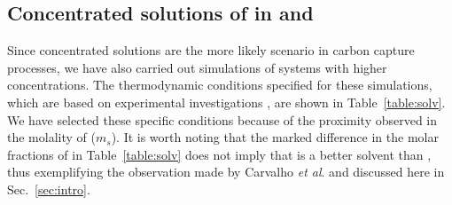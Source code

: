 \documentclass[3p,twocolumn]{elsarticle}
\begin{document}
\subsection{Concentrated solutions of  in \ce{[emim][B(CN)_4]} and \ce{[emim][NTf_2]}}
\label{sec:results_conc}

Since concentrated solutions are the more likely scenario in carbon capture processes, we have also carried out simulations of systems with higher  concentrations.
The thermodynamic conditions specified for these simulations, which are based on experimental investigations \cite{Makino_2014,Schilderman_2007}, are shown in Table~\ref{table:solv}.
We have selected these specific conditions because of the proximity observed in the molality of  ($m_s$).
It is worth noting that the marked difference in the molar fractions of  in Table~\ref{table:solv} does not imply that \ce{[emim][NTf_2]} is a better solvent than \ce{[emim][B(CN)_4]}, thus exemplifying the observation made by Carvalho \textit{et al}. \cite{Carvalho_2016} and discussed here in Sec.~\ref{sec:intro}.
\end{document}
